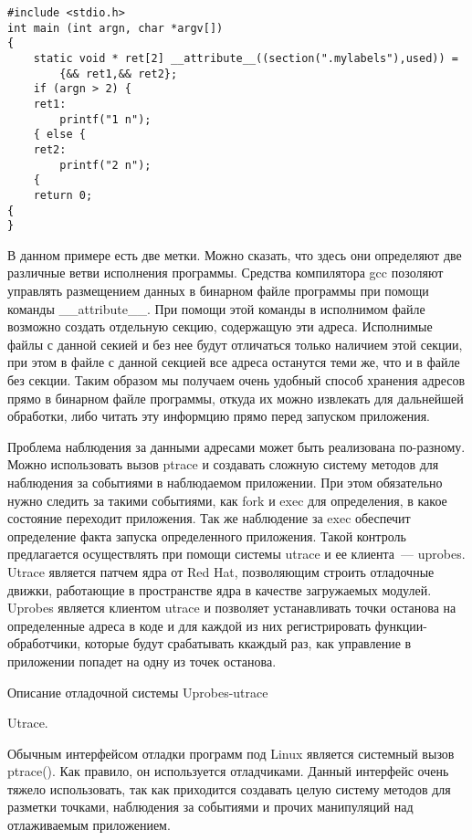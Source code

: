 \bigskip
\begin{lstlisting}
#include <stdio.h>
int main (int argn, char *argv[])
{ 
	static void * ret[2] __attribute__((section(".mylabels"),used)) = 
		{&& ret1,&& ret2};
	if (argn > 2) {
	ret1:
		printf("1 n");
	{ else {
	ret2:
		printf("2 n");
	{
	return 0;
{ 
}
\end{lstlisting}
\bigskip
В данном примере есть две метки. Можно сказать, что здесь они определяют две различные ветви исполнения программы. Средства компилятора gcc позоляют управлять размещением данных в бинарном файле программы при помощи команды \_\_attribute\_\_. При помощи этой команды в исполнимом файле возможно создать отдельную секцию, содержащую эти адреса. Исполнимые файлы с данной секией и без нее будут отличаться только наличием этой секции, при этом в файле с данной секцией все адреса останутся теми же, что и в файле без секции. Таким образом мы получаем очень удобный способ хранения адресов прямо в бинарном файле программы, откуда их можно извлекать для дальнейшей обработки, либо читать эту информцию прямо перед запуском приложения.

Проблема наблюдения за данными адресами может быть реализована по-разному. Можно использовать вызов ptrace и создавать сложную систему методов для наблюдения за событиями в наблюдаемом приложении. При этом обязательно нужно следить за такими событиями, как fork и exec для определения, в какое состояние переходит приложения. Так же наблюдение за exec обеспечит определение факта запуска определенного приложения. Такой контроль предлагается осуществлять при помощи системы utrace и ее клиента~--- uprobes. Utrace является патчем ядра от Red Hat, позволяющим строить отладочные движки, работающие в пространстве ядра в качестве загружаемых модулей. Uprobes является клиентом utrace и позволяет устанавливать точки останова на определенные адреса в коде и для каждой из них регистрировать функции-обработчики, которые будут срабатывать ккаждый раз, как управление в приложении попадет на одну из точек останова. 

\bigskip
Описание отладочной системы Uprobes-utrace

\bigskip
Utrace.

\bigskip
Обычным интерфейсом отладки программ под Linux является системный вызов ptrace(). Как правило, он используется отладчиками. Данный интерфейс очень тяжело использовать, так как приходится создавать целую систему методов для разметки точками, наблюдения за событиями и прочих манипуляций над отлаживаемым приложением. 

